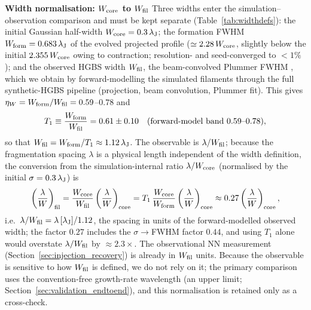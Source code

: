 \documentclass[usenatbib,twoside,twocolumn]{mnras}
\begin{document}
\textbf{Width normalisation: $W_{\rm core}$ to $W_{\rm fil}$}
\label{sec:width_correction}
Three widths enter the simulation--observation comparison and must be kept separate (Table~\ref{tab:widthdefs}): the initial Gaussian half-width $W_{\rm core}=0.3\,\lambda_{\rm J}$; the formation FWHM $W_{\rm form}=0.683\,\lambda_{\rm J}$ of the evolved projected profile ($\simeq2.28\,W_{\rm core}$, slightly below the initial $2.355\,W_{\rm core}$ owing to contraction; resolution- and seed-converged to $<1\%$); and the observed HGBS width $W_{\rm fil}$, the beam-convolved Plummer FWHM \citep{Arzoumanian2019}, which we obtain by forward-modelling the simulated filaments through the full synthetic-HGBS pipeline (projection, beam convolution, Plummer fit). This gives $\eta_W=W_{\rm form}/W_{\rm fil}=0.59$--$0.78$ and
\begin{equation}
T_1 \equiv \frac{W_{\rm form}}{W_{\rm fil}} = 0.61 \pm 0.10 \quad (\text{forward-model band } 0.59\text{--}0.78),
\label{eq:t1_correction}
\end{equation}
so that $W_{\rm fil}=W_{\rm form}/T_1\approx1.12\,\lambda_{\rm J}$. The observable is $\lambda/W_{\rm fil}$; because the fragmentation spacing $\lambda$ is a physical length independent of the width definition, the conversion from the simulation-internal ratio $\lambda/W_{\rm core}$ (normalised by the initial $\sigma=0.3\,\lambda_{\rm J}$) is
\begin{equation}
\left(\frac{\lambda}{W}\right)_{\rm fil} = \frac{W_{\rm core}}{W_{\rm fil}}\left(\frac{\lambda}{W}\right)_{\rm core} = T_1\,\frac{W_{\rm core}}{W_{\rm form}}\left(\frac{\lambda}{W}\right)_{\rm core} \approx 0.27\left(\frac{\lambda}{W}\right)_{\rm core},
\label{eq:t1_apply}
\end{equation}
i.e.\ $\lambda/W_{\rm fil}=\lambda\,[\lambda_{\rm J}]/1.12$, the spacing in units of the forward-modelled observed width; the factor $0.27$ includes the $\sigma\!\to\!$FWHM factor $0.44$, and using $T_1$ alone would overstate $\lambda/W_{\rm fil}$ by $\approx2.3\times$. The observational NN measurement (Section~\ref{sec:injection_recovery}) is already in $W_{\rm fil}$ units. Because the observable is sensitive to how $W_{\rm fil}$ is defined, we do not rely on it; the primary comparison uses the convention-free growth-rate wavelength (an upper limit; Section~\ref{sec:validation_endtoend}), and this normalisation is retained only as a cross-check.
\end{document}

